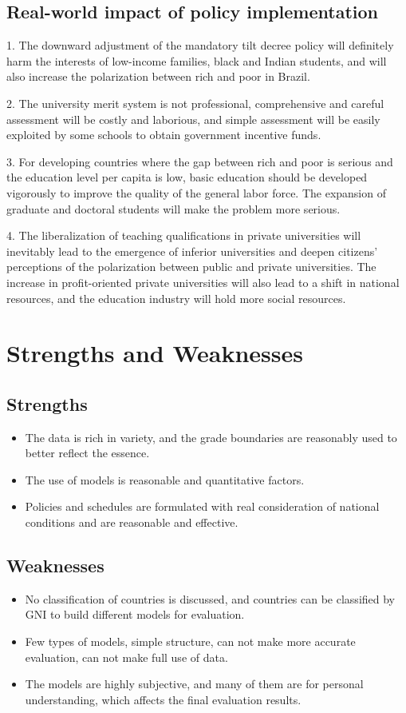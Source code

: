 \documentclass[12pt]{article}  %
\begin{document}
\subsection{Real-world impact of policy implementation}
1. The downward adjustment of the mandatory tilt decree policy will definitely harm the interests of low-income families, black and Indian students, and will also increase the polarization between rich and poor in Brazil.

2. The university merit system is not professional, comprehensive and careful assessment will be costly and laborious, and simple assessment will be easily exploited by some schools to obtain government incentive funds.

3. For developing countries where the gap between rich and poor is serious and the education level per capita is low, basic education should be developed vigorously to improve the quality of the general labor force. The expansion of graduate and doctoral students will make the problem more serious.

4. The liberalization of teaching qualifications in private universities will inevitably lead to the emergence of inferior universities and deepen citizens' perceptions of the polarization between public and private universities. The increase in profit-oriented private universities will also lead to a shift in national resources, and the education industry will hold more social resources.
\section{Strengths and Weaknesses}
\subsection{Strengths}
\begin{itemize}
    \item The data is rich in variety, and the grade boundaries are reasonably used to better reflect the essence.
    \item The use of models is reasonable and quantitative factors.
    \item Policies and schedules are formulated with real consideration of national conditions and are reasonable and effective.
\end{itemize}

\subsection{Weaknesses}
\begin{itemize}
    \item No classification of countries is discussed, and countries can be classified by GNI to build different models for evaluation.
    \item Few types of models, simple structure, can not make more accurate evaluation, can not make full use of data.
    \item The models are highly subjective, and many of them are for personal understanding, which affects the final evaluation results.
 \end{itemize}
 
\end{document}
